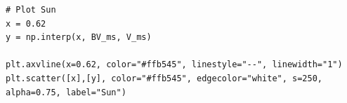 \documentclass[12pt]{article}
\begin{document}
\begin{minipage}{\linewidth}
\captionsetup{hypcap=false}

\begin{mintedbox}
\begin{verbatim}
# Plot Sun
x = 0.62
y = np.interp(x, BV_ms, V_ms)

plt.axvline(x=0.62, color="#ffb545", linestyle="--", linewidth="1")
plt.scatter([x],[y], color="#ffb545", edgecolor="white", s=250, alpha=0.75, label="Sun")
\end{verbatim}
\end{mintedbox}

\end{minipage}
\end{document}
